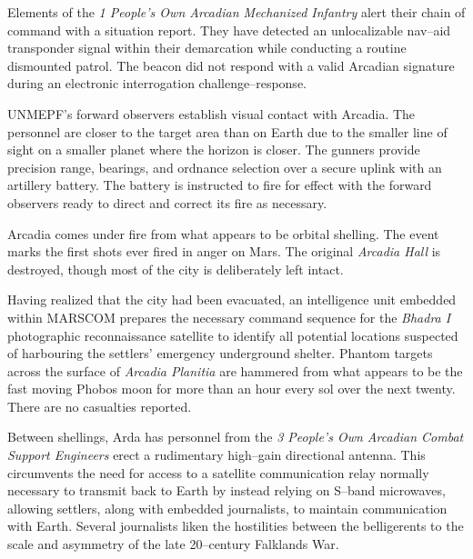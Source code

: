 

Elements of the {\it 1 People's Own Arcadian Mechanized Infantry} alert their chain of command with a situation report. They have detected an unlocalizable nav--aid transponder signal within their demarcation while conducting a routine dismounted patrol. The beacon did not respond with a valid Arcadian signature during an electronic interrogation challenge--response.
\StopTimelineDate

UNMEPF's forward observers establish visual contact with Arcadia. The personnel are closer to the target area than on Earth due to the smaller line of sight on a smaller planet where the horizon is closer. The gunners provide precision range, bearings, and ordnance selection over a secure uplink with an artillery battery. The battery is instructed to fire for effect with the forward observers ready to direct and correct its fire as necessary.

Arcadia comes under fire from what appears to be orbital shelling. The event marks the first shots ever fired in anger on Mars. The original {\it Arcadia Hall} is destroyed, though most of the city is deliberately left intact. 

Having realized that the city had been evacuated, an intelligence unit embedded within MARSCOM prepares the necessary command sequence for the {\it Bhadra I} photographic reconnaissance satellite to identify all potential locations suspected of harbouring the settlers' emergency underground shelter. Phantom targets across the surface of {\it Arcadia Planitia} are hammered from what appears to be the fast moving Phobos moon for more than an hour every sol over the next twenty. There are no casualties reported.

Between shellings, Arda has personnel from the {\it 3 People's Own Arcadian Combat Support Engineers} erect a rudimentary high--gain directional antenna. This circumvents the need for access to a satellite communication relay normally necessary to transmit back to Earth by instead relying on S--band microwaves, allowing settlers, along with embedded journalists, to maintain communication with Earth. Several journalists liken the hostilities between the belligerents to the scale and asymmetry of the late 20--century Falklands War.

